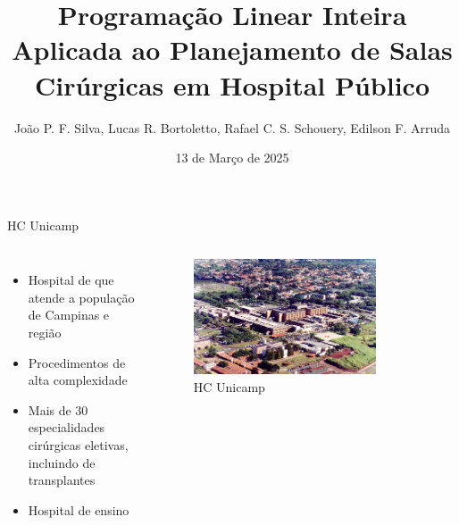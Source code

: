 \documentclass[10pt]{beamer}
\title{Programação Linear Inteira Aplicada ao Planejamento de Salas Cirúrgicas em Hospital Público}
\subtitle{João P. F. Silva, Lucas R. Bortoletto, Rafael C. S. Schouery, Edilson F. Arruda}
\date{13 de Março de 2025}
\begin{document}
\maketitle

\begin{frame}{HC Unicamp}
    \begin{columns}
        \begin{itemize}
            \setlength\itemsep{1em}
            \item Hospital de que atende a população de Campinas e região
            \item Procedimentos de alta complexidade
            \item Mais de 30 especialidades cirúrgicas eletivas, incluindo de transplantes
            \item Hospital de ensino
        \end{itemize}
        \begin{figure}
            \centering
            \includegraphics[width=0.8\textwidth]{images/aereahc.jpg}
            \caption{HC Unicamp}
        \end{figure}
    \end{columns}
\end{frame}
\end{document}
